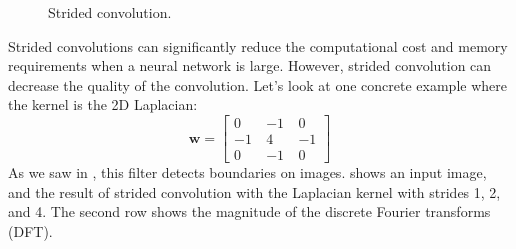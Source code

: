 \begin{figure}[h!]
{
    }
    \caption{Strided convolution.}
    \label{fig:convolutional_neural_networks:strided_conv_diagram}
\end{figure}
\vspace{-0.5cm}

Strided convolutions can significantly reduce the computational cost and memory requirements when a neural network is large. However, strided convolution can decrease the quality of the convolution. Let's look at one concrete example where the kernel is the 2D Laplacian:
\begin{equation}
    \mathbf{w} =
    \begin{bmatrix}
        0 ~  & -1 ~ & 0  \\
        -1 ~ & 4 ~  & -1 \\
        0~   & -1 ~ & 0
    \end{bmatrix}
\end{equation}
As we saw in \chap{\ref{chapter:image_derivatives}}, this filter detects boundaries on images. \Fig{\ref{fig:convolutional_neural_nets:strided_conv_results}} shows an input image, and the result of strided convolution with the Laplacian kernel with strides 1, 2, and 4. The second row shows the magnitude of the discrete Fourier transforms (DFT).

